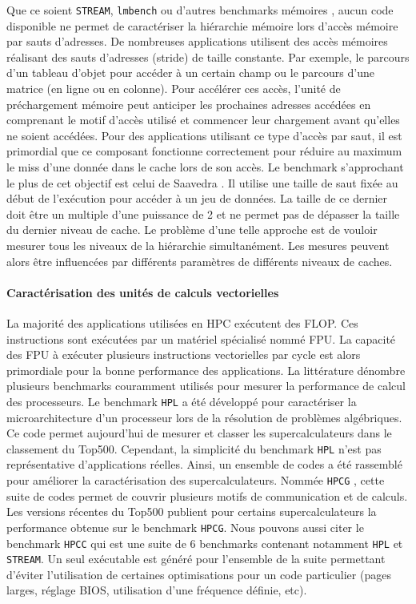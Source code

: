                 Que ce soient \verb|STREAM|, \verb|lmbench| ou d'autres benchmarks mémoires \cite{Yotov2005, Luszczek2006, gonzalez2010servet, Dongarra2013, Bucek2018}, aucun code disponible ne permet de caractériser la hiérarchie mémoire lors d'accès mémoire par sauts d'adresses. De nombreuses applications utilisent des accès mémoires réalisant des sauts d'adresses (\gls{stride}) de taille constante. Par exemple, le parcours d'un tableau d'objet pour accéder à un certain champ ou le parcours d'une matrice (en ligne ou en colonne). Pour accélérer ces accès, l'unité de préchargement mémoire peut anticiper les prochaines adresses accédées en comprenant le motif d'accès utilisé et commencer leur chargement avant qu'elles ne soient accédées. Pour des applications utilisant ce type d'accès par saut, il est primordial que ce composant fonctionne correctement pour réduire au maximum le \gls{miss} d'une donnée dans le cache lors de son accès.
                Le benchmark s'approchant le plus de cet objectif est celui de Saavedra  \cite{Saavedra1995}.  Il utilise une taille de saut fixée au début de l'exécution pour accéder à un jeu de données. La taille de ce dernier doit être un multiple d'une puissance de 2 et ne permet pas de dépasser la taille du dernier niveau de cache. Le problème d'une telle approche est de vouloir mesurer tous les niveaux de la hiérarchie simultanément. Les mesures peuvent alors être influencées par différents paramètres de différents niveaux de caches.
        
            \paragraph{Caractérisation des unités de calculs vectorielles}
            
                La majorité des applications utilisées en \gls{HPC} exécutent des \gls{FLOP}. Ces instructions sont exécutées par un matériel spécialisé nommé \gls{FPU}. La capacité des FPU à exécuter plusieurs instructions vectorielles par cycle est alors primordiale pour la bonne performance des applications. La littérature dénombre plusieurs benchmarks couramment utilisés pour mesurer la performance de calcul des processeurs. Le benchmark \verb|HPL| \cite{Dongarra2003} a été développé pour caractériser la microarchitecture d'un processeur lors de la résolution de problèmes algébriques. Ce code permet aujourd'hui de mesurer et classer les supercalculateurs dans le classement du Top500. Cependant, la simplicité du benchmark \verb|HPL| n'est pas représentative d'applications réelles. Ainsi, un ensemble de codes a été rassemblé pour améliorer la caractérisation des supercalculateurs. Nommée \verb|HPCG| \cite{Dongarra2013}, cette suite de codes permet de couvrir plusieurs motifs de communication et de calculs. Les versions récentes du Top500 publient pour certains supercalculateurs la performance obtenue sur le benchmark \verb|HPCG|. Nous pouvons aussi citer le benchmark \verb|HPCC| \cite{Luszczek2006} qui est une suite de 6 benchmarks contenant notamment \verb|HPL| et \verb|STREAM|. Un seul exécutable est généré pour l'ensemble de la suite permettant d'éviter l'utilisation de certaines optimisations pour un code particulier (pages larges, réglage BIOS, utilisation d'une fréquence définie, etc). 

